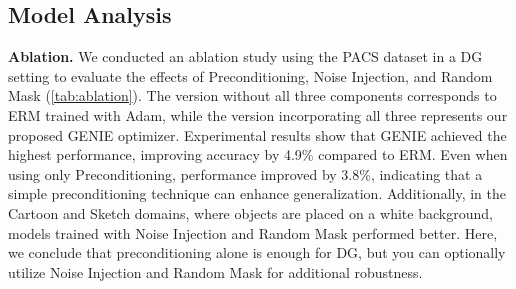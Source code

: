 \documentclass{article}
\theoremstyle{plain}
\theoremstyle{definition}
\theoremstyle{remark}
\begin{document}
\subsection{Model Analysis}
\label{Sec-4:Model Analysis}

\textbf{Ablation.} We conducted an ablation study using the PACS dataset in a DG setting to evaluate the effects of Preconditioning, Noise Injection, and Random Mask (\cref{tab:ablation}). The version without all three components corresponds to ERM trained with Adam, while the version incorporating all three represents our proposed GENIE optimizer. Experimental results show that GENIE achieved the highest performance, improving accuracy by 4.9\% compared to ERM. Even when using only Preconditioning, performance improved by 3.8\%, indicating that a simple preconditioning technique can enhance generalization. Additionally, in the Cartoon and Sketch domains, where objects are placed on a white background, models trained with Noise Injection and Random Mask performed better. Here, we conclude that preconditioning alone is enough for DG, but you can optionally utilize Noise Injection and Random Mask for additional robustness.
\begin{table}[ht]
\caption{Ablation study on the PACS dataset. Results are reported for evaluations on four domains: Art, Cartoon, Photo, and Sketch.}
\label{tab:ablation}
\vskip 0.15in
\begin{center}
\begin{small}
\begin{sc}
\end{sc}
\end{small}
\end{center}
\vskip -0.1in
\end{table}
\end{document}
